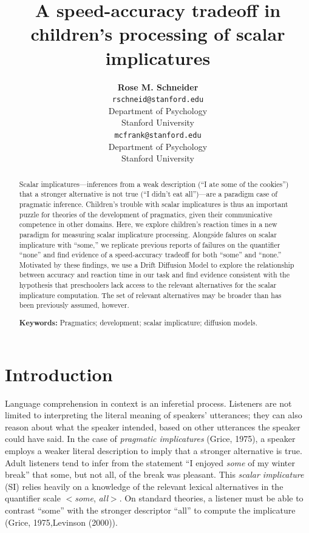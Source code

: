 \documentclass[10pt, letterpaper]{article}
\title{A speed-accuracy tradeoff in children's processing of scalar
implicatures}
\author{{\large \bf Rose M. Schneider} \\ \texttt{rschneid@stanford.edu} \\ Department of Psychology \\ Stanford University \And {\large \bf Michael C. Frank} \\ \texttt{mcfrank@stanford.edu} \\ Department of Psychology \\ Stanford University}
\begin{document}
\maketitle

\begin{abstract}
Scalar implicatures---inferences from a weak description (``I ate some
of the cookies'') that a stronger alternative is not true (``I didn't
eat all'')---are a paradigm case of pragmatic inference. Children's
trouble with scalar implicatures is thus an important puzzle for
theories of the development of pragmatics, given their communicative
competence in other domains. Here, we explore children's reaction times
in a new paradigm for measuring scalar implicature processing. Alongside
falures on scalar implicature with ``some,'' we replicate previous
reports of failures on the quantifier ``none'' and find evidence of a
speed-accuracy tradeoff for both ``some'' and ``none.'' Motivated by
these findings, we use a Drift Diffusion Model to explore the
relationship between accuracy and reaction time in our task and find
evidence consistent with the hypothesis that preschoolers lack access to
the relevant alternatives for the scalar implicature computation. The
set of relevant alternatives may be broader than has been previously
assumed, however.

\textbf{Keywords:}
Pragmatics; development; scalar implicature; diffusion models.
\end{abstract}

\section{Introduction}\label{introduction}

Language comprehension in context is an inferetial process. Listeners
are not limited to interpreting the literal meaning of speakers'
utterances; they can also reason about what the speaker intended, based
on other utterances the speaker could have said. In the case of
\emph{pragmatic implicatures} (Grice, 1975), a speaker employs a weaker
literal description to imply that a stronger alternative is true. Adult
listeners tend to infer from the statement ``I enjoyed \emph{some} of my
winter break'' that some, but not all, of the break was pleasant. This
\emph{scalar implicature} (SI) relies heavily on a knowledge of the
relevant lexical alternatives in the quantifier scale \(<\)\emph{some},
\emph{all}\(>\). On standard theories, a listener must be able to
contrast ``some'' with the stronger descriptor ``all'' to compute the
implicature (Grice, 1975,Levinson (2000)).
\end{document}
